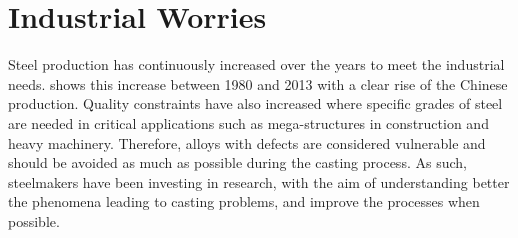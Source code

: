 %
%
%
%

\section{Industrial Worries}

Steel production has continuously increased over the years to meet the industrial needs. 
 shows this increase between 1980 and 2013 with a 
clear rise of the Chinese production. Quality constraints have also increased where specific 
grades of steel are needed in critical applications such as mega-structures
in construction and  heavy machinery. Therefore, alloys with defects are considered vulnerable 
and should be avoided as much as possible during the casting process. As such, steelmakers have been investing
in research, with the aim of understanding better the phenomena leading to casting problems, 
and improve the processes when possible.

